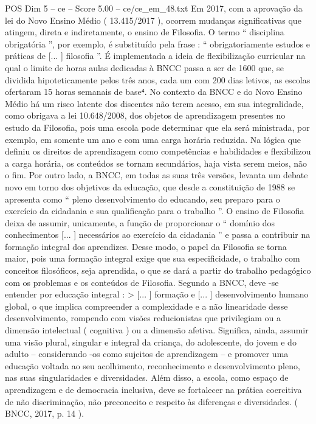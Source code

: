 \begin{textsample}{POS Dim 5 – ce – Score 5.00 – ce/ce\_em\_48.txt}
Em 2017, com a aprovação da lei do Novo Ensino Médio ( 13.415/2017 ), ocorrem mudanças significativas que atingem, direta e indiretamente, o ensino de Filosofia.
O termo “ disciplina obrigatória ”, por exemplo, é substituído pela frase : “ obrigatoriamente estudos e práticas de [... ] filosofia ”.
É implementada a ideia de flexibilização curricular na qual o limite de horas aulas dedicadas à BNCC passa a ser de 1600 que, se dividida hipoteticamente pelos três anos, cada um com 200 dias letivos, as escolas ofertaram 15 horas semanais de base⁴.
No contexto da BNCC e do Novo Ensino Médio há um risco latente dos discentes não terem acesso, em sua integralidade, como obrigava a lei 10.648/2008, dos objetos de aprendizagem presentes no estudo da Filosofia, pois uma escola pode determinar que ela será ministrada, por exemplo, em somente um ano e com uma carga horária reduzida.
Na lógica que definiu os direitos de aprendizagem como competências e habilidades e flexibilizou a carga horária, os conteúdos se tornam secundários, haja vista serem meios, não o fim.
Por outro lado, a BNCC, em todas as suas três versões, levanta um debate novo em torno dos objetivos da educação, que desde a constituição de 1988 se apresenta como “ pleno desenvolvimento do educando, seu preparo para o exercício da cidadania e sua qualificação para o trabalho ”.
O ensino de Filosofia deixa de assumir, unicamente, a função de proporcionar o “ domínio dos conhecimentos [... ] necessários ao exercício da cidadania ” e passa a contribuir na formação integral dos aprendizes.
Desse modo, o papel da Filosofia se torna maior, pois uma formação integral exige que sua especificidade, o trabalho com conceitos filosóficos, seja aprendida, o que se dará a partir do trabalho pedagógico com os problemas e os conteúdos de Filosofia.
Segundo a BNCC, deve -se entender por educação integral : > [... ] formação e [... ] desenvolvimento humano global, o que implica compreender a complexidade e a não linearidade desse desenvolvimento, rompendo com visões reducionistas que privilegiam ou a dimensão intelectual ( cognitiva ) ou a dimensão afetiva.
Significa, ainda, assumir uma visão plural, singular e integral da criança, do adolescente, do jovem e do adulto – considerando -os como sujeitos de aprendizagem – e promover uma educação voltada ao seu acolhimento, reconhecimento e desenvolvimento pleno, nas suas singularidades e diversidades.
Além disso, a escola, como espaço de aprendizagem e de democracia inclusiva, deve se fortalecer na prática coercitiva de não discriminação, não preconceito e respeito às diferenças e diversidades. ( BNCC, 2017, p. 14 ).

\end{textsample}
